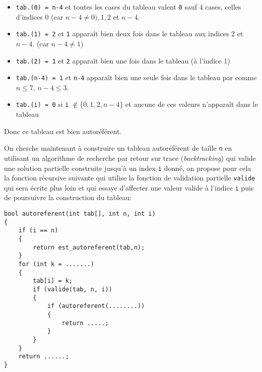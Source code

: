 \documentclass[11pt,a4paper]{article}
\begin{document}
\begin{Exercise}[title = {Tableaux autoréférents}, origin = {\bac \; {\sc oraux ccinp 2024}, {\sc mpi} } ]
{\begin{itemize}
        \item {\tt tab.(0) = n-4} et toutes les cases du tableau valent {\tt 0} sauf 4 cases, celles d'indices $0$ (car $n-4 \neq 0), 1, 2$ et $n-4$.
        \item {\tt tab.(1) = 2} et {\tt 1} apparaît bien deux fois dans le tableau aux indices 2 et $n-4$. (car $n-4 \neq 1$) 
        \item {\tt tab.(2) = 1} et {\tt 2} apparaît bien une fois dans le tableau (à l'indice 1)
        \item {\tt tab.(n-4) = 1} et {\tt n-4} apparaît bien une seule fois dans le tableau par comme $n \leqslant 7$, $n-4 \leqslant 3$.
        \item {\tt tab.(i) = 0} si {\tt i} $\notin \{0,1,2,n-4\}$ et aucune de ces valeurs n'apparaît dans le tableau
     \end{itemize}
     Donc ce tableau est bien autoréférent.
     }
	
	\NRet
    On cherche maintenant à construire un tableau autoréférent de taille {\tt n} en utilisant un algorithme de recherche par retour sur trace (\textit{backtracking}) qui valide une solution partielle construite jusqu'à un index {\tt i} donné, on propose pour cela la fonction récursive suivante qui utilise la fonction de validation partielle {\tt valide} qui sera écrite plus loin et qui essaye d'affecter une valeur valide à l'indice {\tt i} puis de poursuivre la construction du tableau: \\
\begin{verbatim}
bool autoreferent(int tab[], int n, int i)
{
    if (i == n)
    {
        return est_autoreferent(tab,n);
    }
    for (int k = .......)
    {
        tab[i] = k;
        if (valide(tab, n, i))
        {
            if (autoreferent(........))
            {
                return .....;
            }
        }
    }
    return ......;
}
\end{verbatim}
    \Ret
    
    
\end{Exercise}
\end{document}
